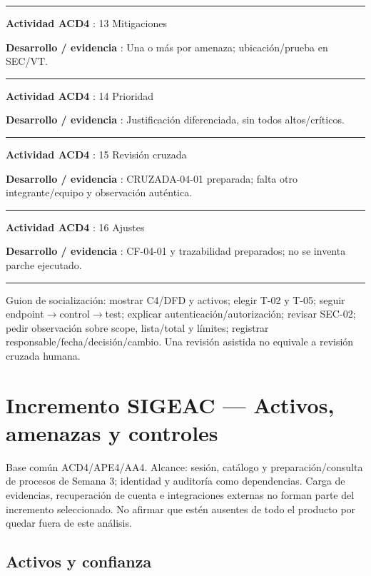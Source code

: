 \documentclass[12pt,a4paper]{report}
\begin{document}
\medskip\hrule\medskip

\textbf{Actividad ACD4 }: 13 Mitigaciones

\textbf{Desarrollo / evidencia }: Una o más por amenaza;
ubicación/prueba en SEC/VT.

\medskip\hrule\medskip

\textbf{Actividad ACD4 }: 14 Prioridad

\textbf{Desarrollo / evidencia }: Justificación diferenciada, sin todos
altos/críticos.

\medskip\hrule\medskip

\textbf{Actividad ACD4 }: 15 Revisión cruzada

\textbf{Desarrollo / evidencia }: CRUZADA-04-01 preparada; falta otro
integrante/equipo y observación auténtica.

\medskip\hrule\medskip

\textbf{Actividad ACD4 }: 16 Ajustes

\textbf{Desarrollo / evidencia }: CF-04-01 y trazabilidad preparados; no
se inventa parche ejecutado.

\medskip\hrule\medskip

Guion de socialización: mostrar C4/DFD y activos; elegir T-02 y T-05;
seguir endpoint\ensuremath{\rightarrow}control\ensuremath{\rightarrow}test; explicar autenticación/autorización;
revisar SEC-02; pedir observación sobre scope, lista/total y límites;
registrar responsable/fecha/decisión/cambio. Una revisión asistida no
equivale a revisión cruzada humana.

\nocite{*}
\appendix
\chapter{Incremento SIGEAC --- Activos, amenazas y
controles}\label{ACD4-semana-4-anexo0-incremento-sigeac--activos-amenazas-y-controles}

Base común ACD4/APE4/AA4. Alcance: sesión, catálogo y
preparación/consulta de procesos de Semana 3; identidad y auditoría como
dependencias. Carga de evidencias, recuperación de cuenta e
integraciones externas no forman parte del incremento seleccionado. No
afirmar que estén ausentes de todo el producto por quedar fuera de este
análisis.

\section{Activos y
confianza}\label{ACD4-semana-4-anexo0-activos-y-confianza}
\end{document}
